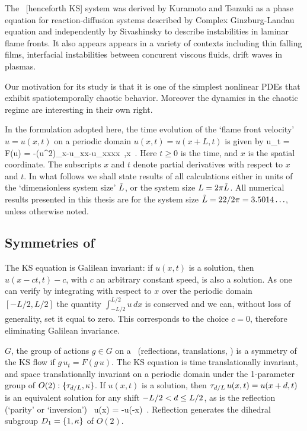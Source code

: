 
 
The \KS\ [henceforth KS] system was derived by Kuramoto and Tsuzuki as a phase equation for reaction-diffusion
systems described by Complex Ginzburg-Landau equation and independently by Sivashinsky to describe instabilities in laminar flame fronts.
It also appears appears in a variety of contexts including thin falling films, interfacial instabilities between concurent viscous fluids, drift waves in plasmas. 

Our motivation for its study is that it is one of the simplest nonlinear PDEs that
exhibit spatiotemporally chaotic behavior. Moreover the dynamics in the chaotic regime are
interesting in their own right.

 In the formulation
adopted here, the time evolution of the `flame front velocity'
$u=u(x,t)$ on a periodic domain $u(x,t) = u(x+L,t)$ is given by
\beq
  u_t = F(u) = -{\textstyle{}}(u^2)_x-u_{xx}-u_{xxxx}
    \,,\qquad   x \in [-L/2,L/2]
    \,.
Here $t \geq 0$ is the time, and $x$ is the spatial coordinate.
The subscripts $x$ and $t$ denote partial derivatives with respect to
$x$ and $t$. In what follows
we shall state results of all calculations either in units of the
`dimensionless system size' $\tilde{L}$, or the system size $L = 2 \pi
\tilde{L}$. All numerical results presented in this thesis
are for the system size $\tilde{L}=22/2\pi = 3.5014\ldots$, unless otherwise
noted.


\subsection{Symmetries of \KSe}
\label{sec:KSeSymm}

The KS equation is Galilean invariant: if $u(x,t)$ is a solution,
then $u(x -ct,t) -c $, with $c$ an arbitrary constant
speed, is also a solution. As one can verify by integrating  with 
respect to $x$ over the periodic domain $[-L/2,L/2]$ the quantity
 $\int_{-L/2}^{L/2} u\,dx$ 
is conserved and we can, without loss of generality, set it equal to zero. This corresponds
to the choice $c=0$, therefore eliminating Galilean invariance.

$G$, the group of actions $ g \in G $ on a
\statesp\ (reflections, translations, \etc) is a symmetry of the KS
flow  if $g\,u_t = F(g\,u)$.
The KS equation is time translationally invariant, and space translationally invariant
on a periodic domain under
the 1-parameter group of
$O(2): \{\tau_{d/L},\kappa \}$.
If $u(x,t)$ is a solution, then
$\tau_{d/L}\, u(x,t) = u(x+d,t)$
is an equivalent solution for any shift
$-L/2 < d \leq L/2$,
as is the
reflection (`parity' or `inversion')
\beq
    \Refl \, u(x) = -u(-x)
\,.
Reflection generates the dihedral subgroup $D_1 = \{1, \kappa\}$
of $O(2)$. 


